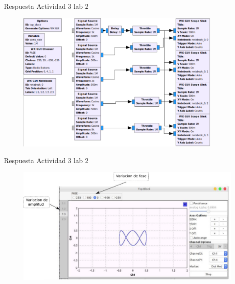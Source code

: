 \begin{frame}{Respuesta Actividad 3 lab 2}
\begin{figure}[H]
	\vspace{-3mm}
	\centering
	\includegraphics[width=0.9\textwidth]{soluciones/actividad-2-2/pdf/Rlab2_3_4.pdf}
\end{figure}
\end{frame}


\begin{frame}{Respuesta Actividad 3 lab 2}
\begin{figure}[H]
	\vspace{-3mm}
	\centering
	\includegraphics[width=1.1\textwidth]{soluciones/actividad-2-2/pdf/Rlab2_3_5.pdf}
\end{figure}
\end{frame}